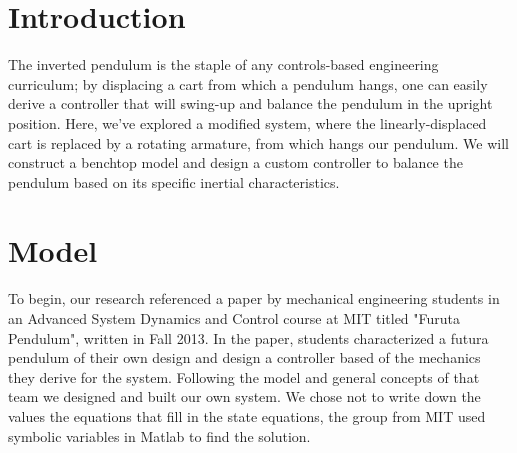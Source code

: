 \documentclass[12pt]{extarticle}
\newenvironment{sect}
  {\adjustwidth{-2.25em}{0pt}}
  {\endadjustwidth}
\begin{document}
\begin{sect} %
\section{Introduction}
    The inverted pendulum is the staple of any controls-based engineering curriculum; by displacing a cart from which a pendulum hangs, one can easily derive a controller that will swing-up and balance the pendulum in the upright position. Here, we've explored a modified system, where the linearly-displaced cart is replaced by a rotating armature, from which hangs our pendulum. We will construct a benchtop model and design a custom controller to balance the pendulum based on its specific inertial characteristics.
\end{sect}

\begin{sect}
\section{Model}
    To begin, our research referenced a paper by mechanical engineering students in an Advanced System Dynamics and Control course at MIT titled "Furuta Pendulum", written in Fall 2013. In the paper, students characterized a futura pendulum of their own design and design a controller based of the mechanics they derive for the system. Following the model and general concepts of that team we designed and built our own system. We chose not to write down the values the equations that fill in the state equations, the group from MIT used symbolic variables in Matlab to find the solution.
    
\end{sect}
\end{document}
